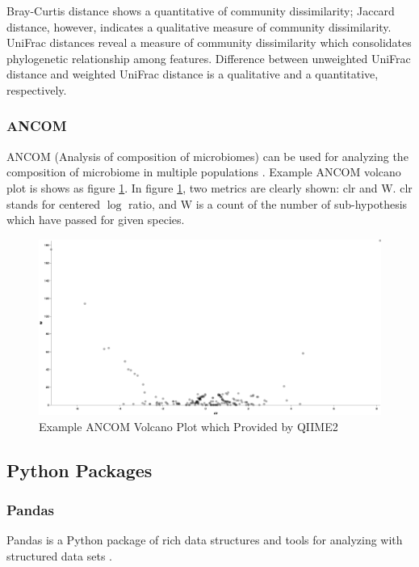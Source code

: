 \documentclass[a4paper]{article}
\begin{document}
                Bray-Curtis distance shows a quantitative of community dissimilarity; Jaccard distance, however, indicates a qualitative measure of community dissimilarity. UniFrac distances reveal a measure of community dissimilarity which consolidates phylogenetic relationship among features. Difference between unweighted UniFrac distance and weighted UniFrac distance is a qualitative and a quantitative, respectively.

            \subsubsection{ANCOM}
                ANCOM (Analysis of composition of microbiomes) can be used for analyzing the composition of microbiome in multiple populations \cite{ANCOM1}. Example ANCOM volcano plot is shows as figure \ref{fig:ancom-example}. In figure \ref{fig:ancom-example}, two metrics are clearly shown: clr and W. clr stands for centered $\log$ ratio, and W is a count of the number of sub-hypothesis which have passed for given species.

                \begin{figure}[p]
                    \centering
                    \includegraphics[width=0.8 \linewidth]{figures/ANCOM/example.png}
                    \caption{Example ANCOM Volcano Plot which Provided by QIIME2 \protect\cite{qiime1, qiime2}}
                    \label{fig:ancom-example}
                \end{figure}

        \subsection{Python Packages}
            \subsubsection{Pandas}
                Pandas is a Python package of rich data structures and tools for analyzing with structured data sets \cite{pandas1}.
\end{document}
